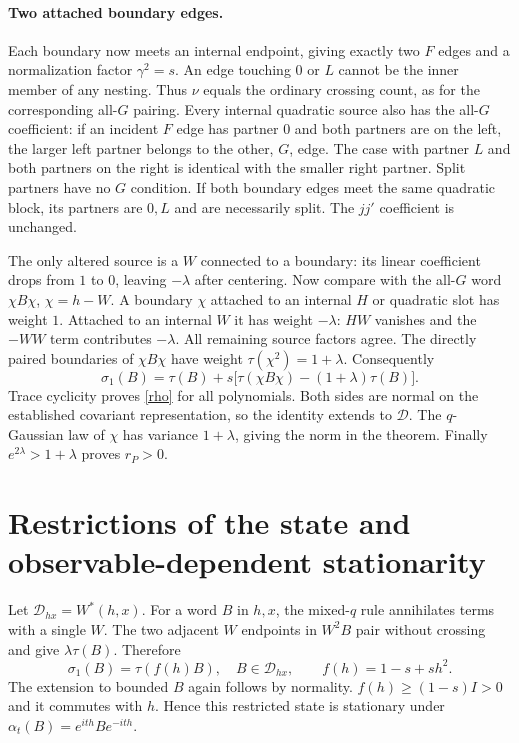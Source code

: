 \documentclass[11pt]{article}
\newcommand{\D}{\mathcal D}
\begin{document}
\paragraph{Two attached boundary edges.}
Each boundary now meets an internal endpoint, giving exactly two $F$
edges and a normalization factor $\gamma^2=s$. An edge touching $0$
or $L$ cannot be the inner member of any nesting. Thus $\nu$ equals
the ordinary crossing count, as for the corresponding all-$G$ pairing.
Every internal quadratic source also has the all-$G$ coefficient:
if an incident $F$ edge has partner $0$ and both partners are on the
left, the larger left partner belongs to the other, $G$, edge. The
case with partner $L$ and both partners on the right is identical with
the smaller right partner. Split partners have no $G$ condition. If
both boundary edges meet the same quadratic block, its partners are
$0,L$ and are necessarily split. The $jj'$ coefficient is unchanged.

The only altered source is a $W$ connected to a boundary: its linear
coefficient drops from $1$ to $0$, leaving $-\lambda$ after centering.
Now compare with the all-$G$ word $\chi B\chi$, $\chi=h-W$.
A boundary $\chi$ attached to an internal $H$ or quadratic slot has
weight $1$. Attached to an internal $W$ it has weight $-\lambda$:
$HW$ vanishes and the $-WW$ term contributes $-\lambda$.
All remaining source factors agree. The directly paired boundaries
of $\chi B\chi$ have weight $\tau(\chi^2)=1+\lambda$. Consequently
\begin{equation}
 \sigma_1(B)=\tau(B)+s\bigl[\tau(\chi B\chi)-(1+\lambda)\tau(B)\bigr].
\end{equation}
Trace cyclicity proves \eqref{rho} for all polynomials. Both sides are
normal on the established covariant representation, so the identity
extends to $\D$. The $q$-Gaussian law of $\chi$ has variance
$1+\lambda$, giving the norm in the theorem. Finally
$e^{2\lambda}>1+\lambda$ proves $r_P>0$.

\newpage
\section{Restrictions of the state and observable-dependent stationarity}
Let $\D_{hx}=W^*(h,x)$. For a word $B$ in $h,x$, the mixed-$q$ rule
annihilates terms with a single $W$. The two adjacent $W$ endpoints
in $W^2B$ pair without crossing and give $\lambda\tau(B)$. Therefore
\begin{equation}\boxed{
 \sigma_1(B)=\tau(f(h)B),\quad B\in\D_{hx},\qquad
 f(h)=1-s+s h^2.}\label{reduced}
\end{equation}
The extension to bounded $B$ again follows by normality.
$f(h)\ge(1-s)I>0$ and it commutes with $h$. Hence this restricted state
is stationary under $\alpha_t(B)=e^{ith}Be^{-ith}$.
\end{document}
